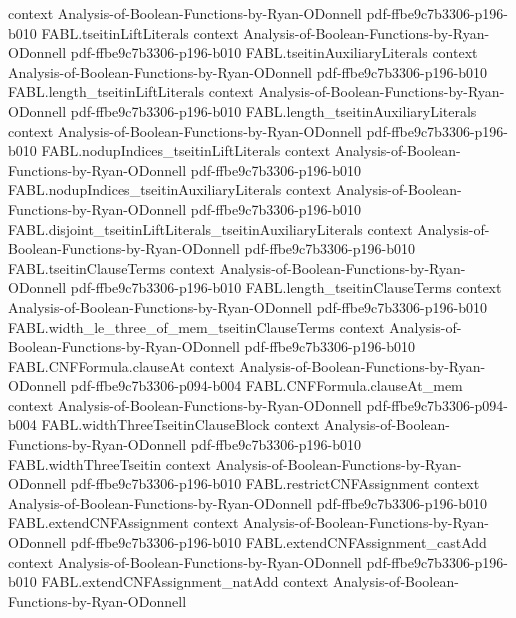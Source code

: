 \begin{theorem}
  {context}
  {Analysis-of-Boolean-Functions-by-Ryan-ODonnell}
  {pdf-ffbe9c7b3306-p196-b010}
\proofstep
  {FABL.tseitinLiftLiterals}
  {context}
  {Analysis-of-Boolean-Functions-by-Ryan-ODonnell}
  {pdf-ffbe9c7b3306-p196-b010}
\proofstep
  {FABL.tseitinAuxiliaryLiterals}
  {context}
  {Analysis-of-Boolean-Functions-by-Ryan-ODonnell}
  {pdf-ffbe9c7b3306-p196-b010}
\proofstep
  {FABL.length_tseitinLiftLiterals}
  {context}
  {Analysis-of-Boolean-Functions-by-Ryan-ODonnell}
  {pdf-ffbe9c7b3306-p196-b010}
\proofstep
  {FABL.length_tseitinAuxiliaryLiterals}
  {context}
  {Analysis-of-Boolean-Functions-by-Ryan-ODonnell}
  {pdf-ffbe9c7b3306-p196-b010}
\proofstep
  {FABL.nodupIndices_tseitinLiftLiterals}
  {context}
  {Analysis-of-Boolean-Functions-by-Ryan-ODonnell}
  {pdf-ffbe9c7b3306-p196-b010}
\proofstep
  {FABL.nodupIndices_tseitinAuxiliaryLiterals}
  {context}
  {Analysis-of-Boolean-Functions-by-Ryan-ODonnell}
  {pdf-ffbe9c7b3306-p196-b010}
\proofstep
  {FABL.disjoint_tseitinLiftLiterals_tseitinAuxiliaryLiterals}
  {context}
  {Analysis-of-Boolean-Functions-by-Ryan-ODonnell}
  {pdf-ffbe9c7b3306-p196-b010}
\proofstep
  {FABL.tseitinClauseTerms}
  {context}
  {Analysis-of-Boolean-Functions-by-Ryan-ODonnell}
  {pdf-ffbe9c7b3306-p196-b010}
\proofstep
  {FABL.length_tseitinClauseTerms}
  {context}
  {Analysis-of-Boolean-Functions-by-Ryan-ODonnell}
  {pdf-ffbe9c7b3306-p196-b010}
\proofstep
  {FABL.width_le_three_of_mem_tseitinClauseTerms}
  {context}
  {Analysis-of-Boolean-Functions-by-Ryan-ODonnell}
  {pdf-ffbe9c7b3306-p196-b010}
\proofstep
  {FABL.CNFFormula.clauseAt}
  {context}
  {Analysis-of-Boolean-Functions-by-Ryan-ODonnell}
  {pdf-ffbe9c7b3306-p094-b004}
\proofstep
  {FABL.CNFFormula.clauseAt_mem}
  {context}
  {Analysis-of-Boolean-Functions-by-Ryan-ODonnell}
  {pdf-ffbe9c7b3306-p094-b004}
\proofstep
  {FABL.widthThreeTseitinClauseBlock}
  {context}
  {Analysis-of-Boolean-Functions-by-Ryan-ODonnell}
  {pdf-ffbe9c7b3306-p196-b010}
\proofstep
  {FABL.widthThreeTseitin}
  {context}
  {Analysis-of-Boolean-Functions-by-Ryan-ODonnell}
  {pdf-ffbe9c7b3306-p196-b010}
\proofstep
  {FABL.restrictCNFAssignment}
  {context}
  {Analysis-of-Boolean-Functions-by-Ryan-ODonnell}
  {pdf-ffbe9c7b3306-p196-b010}
\proofstep
  {FABL.extendCNFAssignment}
  {context}
  {Analysis-of-Boolean-Functions-by-Ryan-ODonnell}
  {pdf-ffbe9c7b3306-p196-b010}
\proofstep
  {FABL.extendCNFAssignment_castAdd}
  {context}
  {Analysis-of-Boolean-Functions-by-Ryan-ODonnell}
  {pdf-ffbe9c7b3306-p196-b010}
\proofstep
  {FABL.extendCNFAssignment_natAdd}
  {context}
  {Analysis-of-Boolean-Functions-by-Ryan-ODonnell}

\end{theorem}

